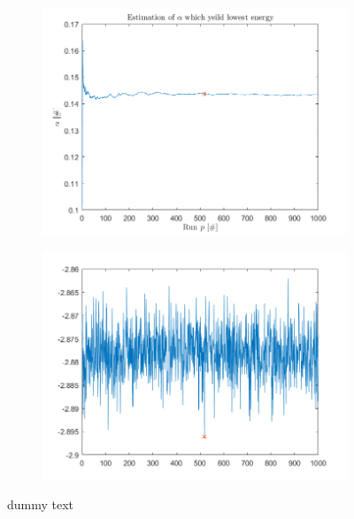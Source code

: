 \begin{figure}[H]
    \centering
    \captionsetup[subfigure]{justification=centering}
    \begin{subfigure}[b]{0.40\textwidth}
        \centering
        \includegraphics[width=\textwidth]{graphics/task4/alpha_estimate.png}
    \end{subfigure}
    \begin{subfigure}[b]{0.40\textwidth}
        \centering
        \includegraphics[width=\textwidth]{graphics/task4/lowest_energy.png}
	\end{subfigure}
    \caption{dummy text}
    \label{fig:alpha_estimation}
\end{figure}

